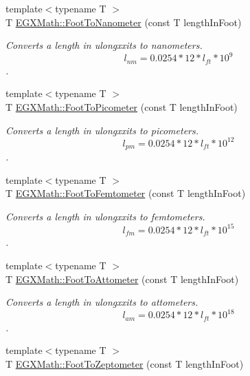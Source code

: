 \begin{DoxyCompactItemize}
{\footnotesize template$<$typename T $>$ }\\T \mbox{\hyperlink{group___e_g_x_math-_conversions-_length_conversions-_imperial-_foot-_s_i_ga617c8ccb63241606ac5eacdac69f78c5}{E\+G\+X\+Math\+::\+Foot\+To\+Nanometer}} (const T length\+In\+Foot)
\begin{DoxyCompactList}\small\item\em Converts a length in ulongxxits to nanometers. \[ l_{nm}=0.0254 * 12 * l_{ft} * 10^{9} \]. \end{DoxyCompactList}\item 
{\footnotesize template$<$typename T $>$ }\\T \mbox{\hyperlink{group___e_g_x_math-_conversions-_length_conversions-_imperial-_foot-_s_i_ga2d46da89e13218f0c8d75356c0d03942}{E\+G\+X\+Math\+::\+Foot\+To\+Picometer}} (const T length\+In\+Foot)
\begin{DoxyCompactList}\small\item\em Converts a length in ulongxxits to picometers. \[ l_{pm}=0.0254 * 12 * l_{ft} * 10^{12} \]. \end{DoxyCompactList}\item 
{\footnotesize template$<$typename T $>$ }\\T \mbox{\hyperlink{group___e_g_x_math-_conversions-_length_conversions-_imperial-_foot-_s_i_gac178ec8356add4e77a27766831cb7247}{E\+G\+X\+Math\+::\+Foot\+To\+Femtometer}} (const T length\+In\+Foot)
\begin{DoxyCompactList}\small\item\em Converts a length in ulongxxits to femtometers. \[ l_{fm}=0.0254 * 12 * l_{ft} * 10^{15} \]. \end{DoxyCompactList}\item 
{\footnotesize template$<$typename T $>$ }\\T \mbox{\hyperlink{group___e_g_x_math-_conversions-_length_conversions-_imperial-_foot-_s_i_ga3831d7a5d7bced625576f0d07644cf24}{E\+G\+X\+Math\+::\+Foot\+To\+Attometer}} (const T length\+In\+Foot)
\begin{DoxyCompactList}\small\item\em Converts a length in ulongxxits to attometers. \[ l_{am}=0.0254 * 12 * l_{ft} * 10^{18} \]. \end{DoxyCompactList}\item 
{\footnotesize template$<$typename T $>$ }\\T \mbox{\hyperlink{group___e_g_x_math-_conversions-_length_conversions-_imperial-_foot-_s_i_ga6418a94f8c9855745fc9eb05c6aa121e}{E\+G\+X\+Math\+::\+Foot\+To\+Zeptometer}} (const T length\+In\+Foot)

\end{DoxyCompactItemize}
